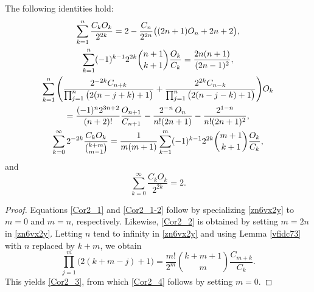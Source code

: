 \documentclass[12pt,reqno]{article}
\begin{document}
\begin{corollary} 
The following identities hold:
\begin{gather}
\sum_{k = 1}^n \frac{{C_k O_k }}{{2^{2k} }} = 2 - \frac{C_n}{2^{2n}} \big( (2n + 1) O_n +2n+2 \big), \label{Cor2_1} \\
\sum_{k = 1}^n (-1)^{k-1} 2^{2k} \binom{n+1}{k+1}\frac{O_k}{C_k} = \frac{2n(n+1)}{(2n-1)^{2}}, \label{Cor2_1-2} 
\\
\sum_{k = 1}^n 
\left(\frac{2^{-2k}C_{n+k}}{\prod_{j = 1}^n \big({2(n-j+k) + 1}\big)}  + \frac{2^{2k}C_{n-k}}{\prod_{j = 1}^n \big(2(n-j-k) + 1\big)} \right)\!{O_k}\notag \\
 = \frac{(-1)^n 2^{3n+2}}{(n+2)!}\frac{O_{n+1}}{C_{n+1}} - \frac{2^{-n}\,O_{n}}{n!(2n+1)} 
-\frac{2^{1-n}}{n!(2n+1)^2},\label{Cor2_2}\\
\sum_{k = 0}^\infty {2^{-2k}\frac{{C_{k} O_{k} }}{\binom{k+m}{m-1}}} 
= \frac{1}{m(m+1)} \sum_{k = 1}^{m} (-1)^{k-1} 2^{2k}\binom{m+1}{k+1}\frac{O_{k}}{C_{k}},\label{Cor2_3}
\end{gather}
and
\begin{equation}\label{Cor2_4}
\sum_{k = 0}^\infty \frac{C_k O_k}{2^{2k}} = 2.
\end{equation}
\end{corollary}
\begin{proof}
Equations \eqref{Cor2_1} and \eqref{Cor2_1-2} follow by specializing \eqref{zn6vx2y} to $m=0$ and $m=n$, respectively. 
	Likewise, \eqref{Cor2_2} is obtained by setting $m=2n$ in 
\eqref{zn6vx2y}. Letting $n$ tend to infinity in \eqref{zn6vx2y} and using Lemma \ref{vfidc73} with $n$ replaced by $k+m$, we obtain 
\begin{equation*}
\prod_{j=1}^{m}\big(2(k+m-j)+1\big) = \frac{m!}{2^m} \binom{k+m+1}{m}\frac{C_{m+k}}{C_k}.
\end{equation*}
This yields \eqref{Cor2_3}, from which \eqref{Cor2_4} follows by setting $m=0$.
\end{proof}
\end{document}
